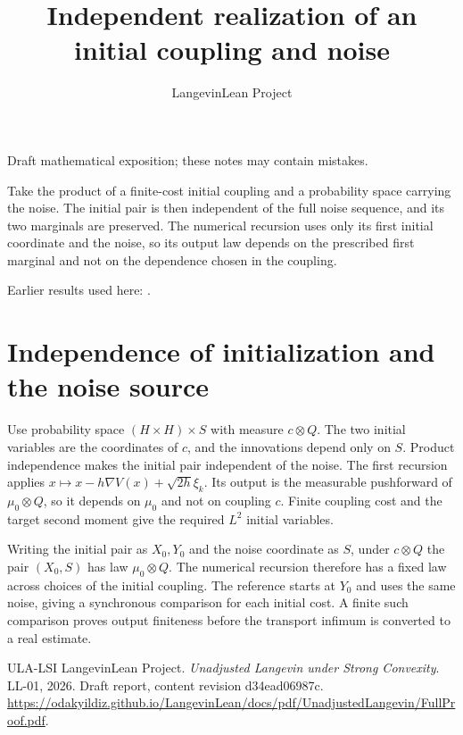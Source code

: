\documentclass[11pt,a4paper]{article}
\title{\texorpdfstring{Independent realization of an initial coupling and noise}{Independent realization of an initial coupling and noise}}
\author{LangevinLean Project}
\date{}
\begin{document}
\maketitle
Draft mathematical exposition; these notes may contain mistakes.


Take the product of a finite-cost initial coupling and a probability space carrying the noise. The initial pair is then independent of the full noise sequence, and its two marginals are preserved. The numerical recursion uses only its first initial coordinate and the noise, so its output law depends on the prescribed first marginal and not on the dependence chosen in the coupling.




Earlier results used here: \cite[Section~3.23]{LangevinLean2026ULASC}.

\section{\texorpdfstring{Independence of initialization and the noise source}{Independence of initialization and the noise source}}


Use probability space \((H\times H)\times S\) with measure \(c\otimes Q\). The two initial variables are the coordinates of \(c\), and the innovations depend only on \(S\). Product independence makes the initial pair independent of the noise. The first recursion applies \(x\mapsto x-h\nabla V(x)+\sqrt{2h}\xi_k\). Its output is the measurable pushforward of \(\mu_0\otimes Q\), so it depends on \(\mu_0\) and not on coupling \(c\). Finite coupling cost and the target second moment give the required \(L^2\) initial variables.



Writing the initial pair as \(X_0,Y_0\) and the noise coordinate as \(S\), under \(c\otimes Q\) the pair \((X_0,S)\) has law \(\mu_0\otimes Q\). The numerical recursion therefore has a fixed law across choices of the initial coupling. The reference starts at \(Y_0\) and uses the same noise, giving a synchronous comparison for each initial cost. A finite such comparison proves output finiteness before the transport infimum is converted to a real estimate.



\begin{thebibliography}{ULA-LSI}
LangevinLean Project. \emph{Unadjusted Langevin under Strong Convexity}. LL-01, 2026. Draft report, content revision d34ead06987c. \url{https://odakyildiz.github.io/LangevinLean/docs/pdf/UnadjustedLangevin/FullProof.pdf}.
\end{thebibliography}
\end{document}
